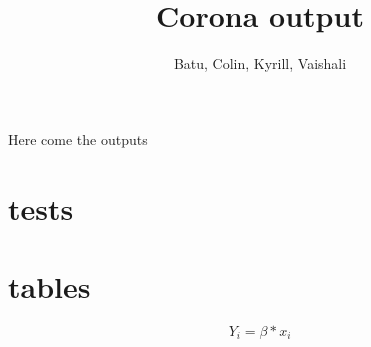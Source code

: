 \documentclass{article}
\title{Corona output}
\author{Batu, Colin, Kyrill, Vaishali}
\date{}
\begin{document}
\maketitle

Here come the outputs

\section{tests}


\section{tables}


\begin{equation}

	Y_i = \beta * x_i

\end{equation}
\end{document}
